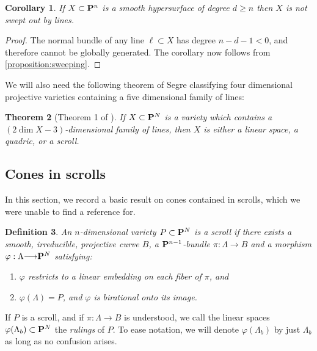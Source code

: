\documentclass[12pt,reqno]{amsart}
\theoremstyle{plain}
\newtheorem{theorem}{Theorem}[section]
\newtheorem{corollary}[theorem]{Corollary}
\newtheorem{definition}[theorem]{Definition}
\theoremstyle{remark}
\numberwithin{equation}{section}
\renewcommand{\to}{{\longrightarrow}}
\renewcommand {\P}{{\bf P}}
\numberwithin{equation}{section}
\begin{document}
\begin{corollary}
  \label{cor:sweeping}
  If $X \subset \P^{n}$ is a smooth hypersurface of degree $d \geq n$
  then $X$ is not swept out by lines.
\end{corollary}

\begin{proof}
  The normal bundle of any line $\ell \subset X$ has degree
  $n-d-1 <0$, and therefore cannot be globally generated.  The
  corollary now follows from \autoref{proposition:sweeping}.
\end{proof}

We will also need the following theorem of Segre classifying four dimensional
projective varieties containing a five dimensional family of lines:

\begin{theorem}[Theorem 1 of \cite{Rogora}]
  \label{theorem:fivelines}
  If $X \subset \P^{N}$ is a variety which contains a
  $(2\dim X-3)$-dimensional family of lines, then $X$ is either a
  linear space, a quadric, or a scroll.
\end{theorem}

\subsection{Cones in scrolls}
\label{sec:linesonscrolls}

In this section, we record a basic result on cones contained in
scrolls, which we were unable to find a reference for.

\begin{definition}
  \label{definition:scroll}
  An $n$-dimensional variety $P \subset \P^{N}$ is a {\sl scroll} if
  there exists a smooth, irreducible, projective curve $B$, a
  $\P^{n-1}$-bundle $\pi: \Lambda \to B$ and a morphism
  $\varphi: \Lambda \to \P^{N}$ satisfying:
  \begin{enumerate}
  \item $\varphi$ restricts to a linear embedding on each fiber of
    $\pi$, and
  \item $\varphi(\Lambda) = P$, and $\varphi$ is birational onto its
    image.
  \end{enumerate}
\end{definition}

If $P$ is a scroll, and if $\pi: \Lambda \to B$ is understood, we call
the linear spaces $\varphi(\Lambda_{b}) \subset \P^{N}$ the {\sl
  rulings} of $P$. To ease notation, we will denote
$\varphi(\Lambda_{b})$ by just $\Lambda_{b}$ as long as no confusion
arises.
\end{document}
